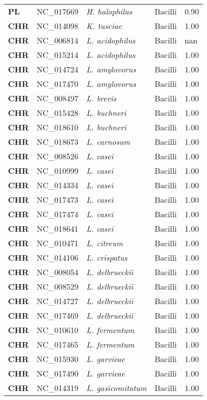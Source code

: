 \begin{adjustwidth}{-3cm}{2cm}
{\begin{supertabular}{>{\bfseries}l|p{0.1\textwidth}p{0.14\textwidth}l|l}
PL & NC\_017669 & \textit{H. halophilus} & Bacilli & 0.90\\
CHR & NC\_014098 & \textit{K. tusciae} & Bacilli & 1.00\\
CHR & NC\_006814 & \textit{L. acidophilus} & Bacilli & nan\\
CHR & NC\_015214 & \textit{L. acidophilus} & Bacilli & 1.00\\
CHR & NC\_014724 & \textit{L. amylovorus} & Bacilli & 1.00\\
CHR & NC\_017470 & \textit{L. amylovorus} & Bacilli & 1.00\\
CHR & NC\_008497 & \textit{L. brevis} & Bacilli & 1.00\\
CHR & NC\_015428 & \textit{L. buchneri} & Bacilli & 1.00\\
CHR & NC\_018610 & \textit{L. buchneri} & Bacilli & 1.00\\
CHR & NC\_018673 & \textit{L. carnosum} & Bacilli & 1.00\\
CHR & NC\_008526 & \textit{L. casei} & Bacilli & 1.00\\
CHR & NC\_010999 & \textit{L. casei} & Bacilli & 1.00\\
CHR & NC\_014334 & \textit{L. casei} & Bacilli & 1.00\\
CHR & NC\_017473 & \textit{L. casei} & Bacilli & 1.00\\
CHR & NC\_017474 & \textit{L. casei} & Bacilli & 1.00\\
CHR & NC\_018641 & \textit{L. casei} & Bacilli & 1.00\\
CHR & NC\_010471 & \textit{L. citreum} & Bacilli & 1.00\\
CHR & NC\_014106 & \textit{L. crispatus} & Bacilli & 1.00\\
CHR & NC\_008054 & \textit{L. delbrueckii} & Bacilli & 1.00\\
CHR & NC\_008529 & \textit{L. delbrueckii} & Bacilli & 1.00\\
CHR & NC\_014727 & \textit{L. delbrueckii} & Bacilli & 1.00\\
CHR & NC\_017469 & \textit{L. delbrueckii} & Bacilli & 1.00\\
CHR & NC\_010610 & \textit{L. fermentum} & Bacilli & 1.00\\
CHR & NC\_017465 & \textit{L. fermentum} & Bacilli & 1.00\\
CHR & NC\_015930 & \textit{L. garvieae} & Bacilli & 1.00\\
CHR & NC\_017490 & \textit{L. garvieae} & Bacilli & 1.00\\
CHR & NC\_014319 & \textit{L. gasicomitatum} & Bacilli & 1.00\\

\end{supertabular}}
\end{adjustwidth}

